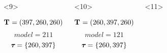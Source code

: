 \begin{frame}
\begin{columns}[c]
\begin{onlyenv}
\begin{minipage}[c][0.5\textheight][c]{\linewidth}
\begin{displaybox}[0.95\linewidth]
                \end{displaybox}
            \end{minipage}
        \end{onlyenv}
        \begin{onlyenv}<9>
            \begin{minipage}[c][0.5\textheight][c]{\linewidth}
                \begin{displaybox}[0.95\linewidth]
                    \begin{minipage}[c][0.45\textheight][c]{0.95\linewidth}
                        \[
                            \mathbf{T_{}} = (397,260,260)
                        \]\vspace{0mm}
                        \[
                            model = 211
                        \]\vspace{0mm}
                        \[
                            \boldsymbol{\tau_{}} = \{260,397\}
                        \]\vspace{0mm}
                    \end{minipage}
                \end{displaybox}
            \end{minipage}
        \end{onlyenv}
        \begin{onlyenv}<10>
            \begin{minipage}[c][0.5\textheight][c]{\linewidth}
                \begin{displaybox}[0.95\linewidth]
                    \begin{minipage}[c][0.45\textheight][c]{0.95\linewidth}
                        \[
                            \mathbf{T_{}} = (260,397,260)
                        \]\vspace{0mm}
                        \[
                            model = 121
                        \]\vspace{0mm}
                        \[
                            \boldsymbol{\tau_{}} = \{260,397\}
                        \]\vspace{0mm}
                    \end{minipage}
                \end{displaybox}
            \end{minipage}
        \end{onlyenv}
        \begin{onlyenv}<11>
            \begin{minipage}[c][0.5\textheight][c]{\linewidth}

\end{minipage}
\end{onlyenv}
\end{columns}
\end{frame}
